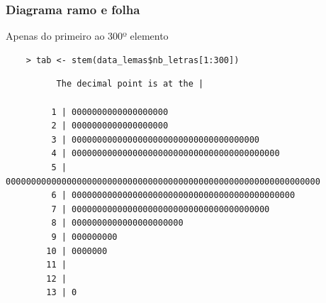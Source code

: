 \documentclass[graphics,14pt]{beamer}
\begin{document}
\begin{frame}[t,fragile=singleslide]
\frametitle{Diagrama ramo e folha}
	Apenas do primeiro ao 300º elemento
	\begin{lstlisting}
	> tab <- stem(data_lemas$nb_letras[1:300])
	\end{lstlisting}
	\vspace{2.0cm}
	
	\begin{addmargin}[2cm]{0em}
		\normalsize 
		\begin{verbatim}
		  The decimal point is at the |
		
		 1 | 0000000000000000000
		 2 | 0000000000000000000
		 3 | 0000000000000000000000000000000000000
		 4 | 00000000000000000000000000000000000000000
		 5 | 00000000000000000000000000000000000000000000000000000000000000
		 6 | 00000000000000000000000000000000000000000000
		 7 | 000000000000000000000000000000000000000
		 8 | 0000000000000000000000
		 9 | 000000000
		10 | 0000000
		11 | 
		12 | 
		13 | 0
		\end{verbatim}
	\end{addmargin}

\end{frame}
\end{document}
